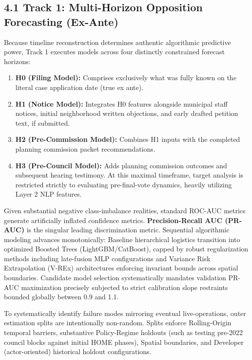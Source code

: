 \subsection*{4.1 Track 1: Multi-Horizon Opposition Forecasting (Ex-Ante)}
Because timeline reconstruction determines authentic algorithmic predictive power, Track 1 executes models across four distinctly constrained forecast horizons:
\begin{enumerate}
    \item \textbf{H0 (Filing Model):} Comprises exclusively what was fully known on the literal case application date (true ex ante).
    \item \textbf{H1 (Notice Model):} Integrates H0 features alongside municipal staff notices, initial neighborhood written objections, and early drafted petition text, if submitted.
    \item \textbf{H2 (Pre-Commission Model):} Combines H1 inputs with the completed planning commission packet recommendations.
    \item \textbf{H3 (Pre-Council Model):} Adds planning commission outcomes and subsequent hearing testimony. At this maximal timeframe, target analysis is restricted strictly to evaluating pre-final-vote dynamics, heavily utilizing Layer 2 NLP features.
\end{enumerate}

Given substantial negative class-imbalance realities, standard ROC-AUC metrics generate artificially inflated confidence metrics. \textbf{Precision-Recall AUC (PR-AUC)} is the singular leading discrimination metric. Sequential algorithmic modeling advances monotonically: Baseline hierarchical logistics transition into optimized Boosted Trees (LightGBM/CatBoost), capped by robust regularization methods including late-fusion MLP configurations and Variance Risk Extrapolation (V-REx) architectures enforcing invariant bounds across spatial boundaries. Candidate model selection systematically mandates validation PR-AUC maximization precisely subjected to strict calibration slope restraints bounded globally between 0.9 and 1.1.

To systematically identify failure modes mirroring eventual live-operations, outer estimation splits are intentionally non-random. Splits enforce Rolling-Origin temporal barriers, substantive Policy-Regime holdouts (such as testing pre-2022 council blocks against initial HOME phases), Spatial boundaries, and Developer (actor-oriented) historical holdout configurations. 

